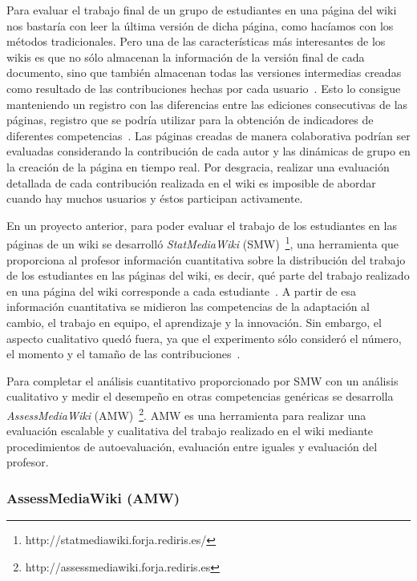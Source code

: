 	Para evaluar el trabajo final de un grupo de estudiantes en una página del wiki nos bastaría con leer la última versión de dicha página, como hacíamos con los métodos tradicionales. Pero una de las características más interesantes de los wikis es que no sólo almacenan la información de la versión final de cada documento, sino que también almacenan todas las versiones intermedias creadas como resultado de las contribuciones hechas por cada usuario~\cite{trentin2009using}. Esto lo consigue manteniendo un registro con las diferencias entre las ediciones consecutivas de las páginas, registro que se podría utilizar para la obtención de indicadores de diferentes competencias~\cite{ortega2011new}. Las páginas creadas de manera colaborativa podrían ser evaluadas considerando la contribución de cada autor y las dinámicas de grupo en la creación de la página en tiempo real. Por desgracia, realizar una evaluación detallada de cada contribución realizada en el wiki es imposible de abordar cuando hay muchos usuarios y éstos participan activamente.

	En un proyecto anterior, para poder evaluar el trabajo de los estudiantes en las páginas de un wiki se desarrolló \emph{StatMediaWiki} (SMW)~\footnote{http://statmediawiki.forja.rediris.es/}, una herramienta que proporciona al profesor información cuantitativa sobre la distribución del trabajo de los estudiantes en las páginas del wiki, es decir, qué parte del trabajo realizado en una página del wiki corresponde a cada estudiante~\cite{duarte2012wikis}.  A partir de esa información cuantitativa se midieron las competencias de la adaptación al cambio, el trabajo en equipo, el aprendizaje y la innovación. Sin embargo, el aspecto cualitativo quedó fuera, ya que el experimento sólo consideró el número, el momento y el tamaño de las contribuciones~\cite{palomo2014assessment}.

	Para completar el análisis cuantitativo proporcionado por SMW con un análisis cualitativo y medir el desempeño en otras competencias genéricas se desarrolla \emph{AssessMediaWiki} (AMW)~\footnote{http://assessmediawiki.forja.rediris.es}. AMW es una herramienta para realizar una evaluación escalable y cualitativa del trabajo realizado en el wiki mediante procedimientos de autoevaluación, evaluación entre iguales y evaluación del profesor.

		\subsubsection{AssessMediaWiki (AMW)}

